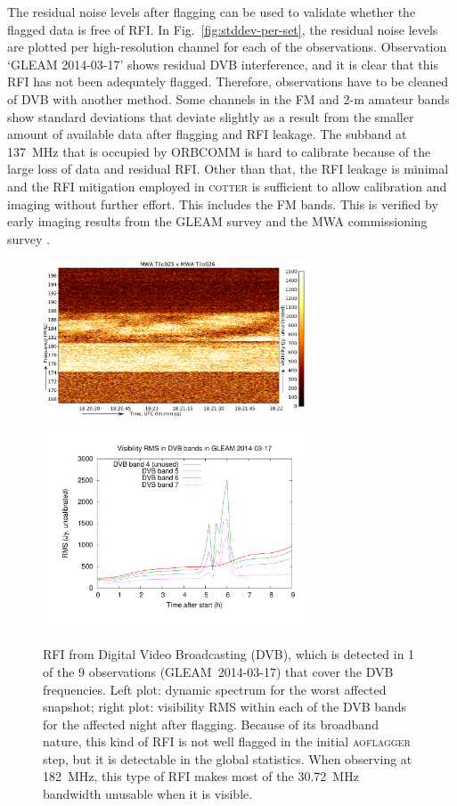 \documentclass{pasa}
\begin{document}
The residual noise levels after flagging can be used to validate whether the flagged data is free of RFI. In Fig.~\ref{fig:stddev-per-set}, the residual noise levels are plotted per high-resolution channel for each of the observations. Observation `GLEAM 2014-03-17' shows residual DVB interference, and it is clear that this RFI has not been adequately flagged. Therefore, observations have to be cleaned of DVB with another method. Some channels in the FM and 2-m amateur bands show standard deviations that deviate slightly as a result from the smaller amount of available data after flagging and RFI leakage. The subband at 137~MHz that is occupied by ORBCOMM is hard to calibrate because of the large loss of data and residual RFI. Other than that, the RFI leakage is minimal and the RFI mitigation employed in \textsc{cotter} is sufficient to allow calibration and imaging without further effort. This includes the FM bands. This is verified by early imaging results from the GLEAM survey and the MWA commissioning survey \citep{mwacs-2014}.

\noindent\begin{figure}%
\begin{center}\hspace*{-0.2cm}\includegraphics[width=8cm]{img/dvb_example}\includegraphics[width=8cm]{img/2014-03-17-dvb-stddevs}
\end{center}
\caption{RFI from Digital Video Broadcasting (DVB), which is detected in 1 of the 9 observations (GLEAM~2014-03-17) that cover the DVB frequencies. Left plot: dynamic spectrum for the worst affected snapshot; right plot: visibility RMS within each of the DVB bands for the affected night after flagging. Because of its broadband nature, this kind of RFI is not well flagged in the initial \textsc{aoflagger} step, but it is detectable in the global statistics. When observing at 182~MHz, this type of RFI makes most of the 30.72~MHz bandwidth unusable when it is visible. }
\label{fig:dvb}
\end{figure}
\end{document}
